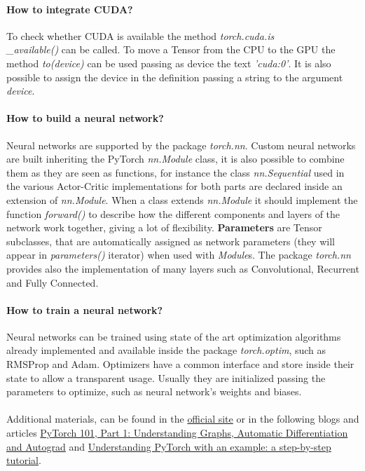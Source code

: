 \documentclass[11pt, a4paper, hidelinks]{report}
\begin{document}
\paragraph{How to integrate CUDA?}\label{par:how-to-integrate-cuda?}
To check whether CUDA is available the method \textit{torch.cuda.is\\\_available()} can be called.
To move a Tensor from the CPU to the GPU the method \textit{to(device)} can be used passing as device the text \textit{'cuda:0'}.
It is also possible to assign the device in the definition passing a string to the argument \textit{device}.

\paragraph{How to build a neural network?}\label{par:how-to-build-a-neural-network?}
Neural networks are supported by the package \textit{torch.nn}.
Custom neural networks are built inheriting the PyTorch \textit{nn.Module} class, it is also possible to combine them as they are seen as functions, for instance the class \textit{nn.Sequential} used in the various Actor-Critic implementations for both parts are declared inside an extension of \textit{nn.Module}.
When a class extends \textit{nn.Module} it should implement the function \textit{forward()} to describe how the different components and layers of the network work together, giving a lot of flexibility.
\textbf{Parameters} are Tensor subclasses, that are automatically assigned as network parameters (they will appear in \textit{parameters()} iterator) when used with \textit{Module}s.
The package \textit{torch.nn} provides also the implementation of many layers such as Convolutional, Recurrent and Fully Connected.

\paragraph{How to train a neural network?}\label{par:how-to-train-a-neural-network?}
Neural networks can be trained using state of the art optimization algorithms already implemented and available inside the package \textit{torch.optim}, such as RMSProp and Adam.
Optimizers have a common interface and store inside their state to allow a transparent usage.
Usually they are initialized passing the parameters to optimize, such as neural network's weights and biases.
\\
\\
Additional materials, can be found in the \href{https://pytorch.org/resources/}{official site} or in the following blogs and articles \href{https://blog.paperspace.com/pytorch-101-understanding-graphs-and-automatic-differentiation/}{PyTorch 101, Part 1: Understanding Graphs, Automatic Differentiation and Autograd} and \href{https://towardsdatascience.com/understanding-pytorch-with-an-example-a-step-by-step-tutorial-81fc5f8c4e8e}{Understanding PyTorch with an example: a step-by-step tutorial}.
\end{document}
